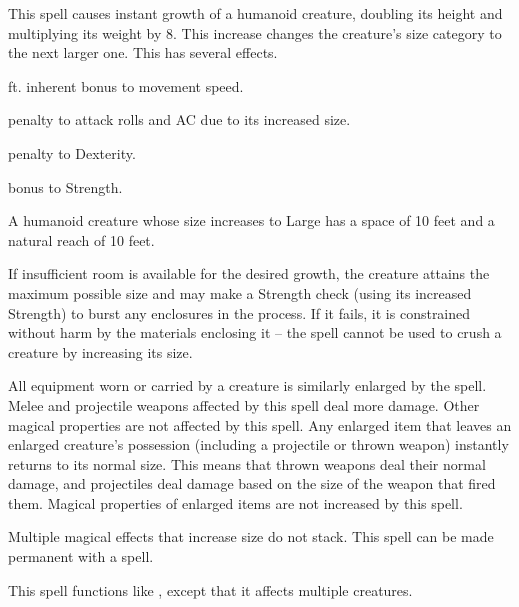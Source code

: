 \spellrng{\rngclose}
\begin{spelleffect}
  This spell causes instant growth of a humanoid creature, doubling its height and multiplying its weight by 8. This increase changes the creature's size category to the next larger one. This has several effects.
  \begin{itemize*} 
    \item {} ft. inherent bonus to movement speed.
    \item {} penalty to attack rolls and AC due to its increased size.
  \item {} penalty to Dexterity.
  \item {} bonus to Strength.
  \end{itemize*}
  \par A humanoid creature whose size increases to Large has a space of 10 feet and a natural reach of 10 feet.
  \par If insufficient room is available for the desired growth, the creature attains the maximum possible size and may make a Strength check (using its increased Strength) to burst any enclosures in the process. If it fails, it is constrained without harm by the materials enclosing it -- the spell cannot be used to crush a creature by increasing its size.
  \par All equipment worn or carried by a creature is similarly enlarged by the spell. Melee and projectile weapons affected by this spell deal more damage. Other magical properties are not affected by this spell. Any enlarged item that leaves an enlarged creature's possession (including a projectile or thrown weapon) instantly returns to its normal size. This means that thrown weapons deal their normal damage, and projectiles deal damage based on the size of the weapon that fired them. Magical properties of enlarged items are not increased by this spell.
\end{spelleffect}
\begin{spellnotes}
  Multiple magical effects that increase size do not stack. This spell can be made permanent with a  spell.
\end{spellnotes}

\spellrng{\rngmed}
\begin{spelleffect}
  This spell functions like , except that it affects multiple creatures.
\end{spelleffect}

